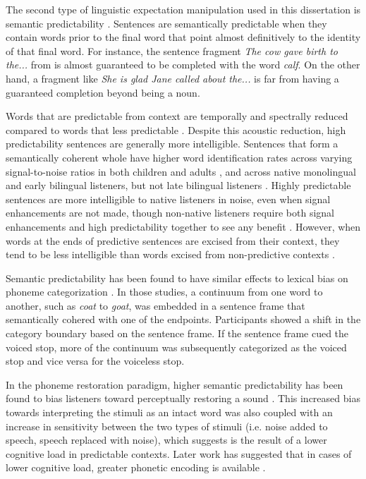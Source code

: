 The second type of linguistic expectation manipulation used in this dissertation is semantic predictability \citep{Kalikow1977}.
Sentences are semantically predictable when they contain words prior to the final word that point almost definitively to the identity of that final word.  
For instance, the sentence fragment \emph{The cow gave birth to the...} from \citet{Kalikow1977} is almost guaranteed to be completed with the word \emph{calf}.  
On the other hand, a fragment like \emph{She is glad Jane called about the...} is far from having a guaranteed completion beyond being a noun.

Words that are predictable from context are temporally and spectrally reduced compared to words that less predictable \cite{Scarborough2010, Clopper2008}. Despite this acoustic reduction, high predictability sentences are generally more intelligible.
Sentences that form a semantically coherent whole have higher word identification rates across varying signal-to-noise ratios \citep{Kalikow1977} in both children and adults \citep{Fallon2002}, and across native monolingual and early bilingual listeners, but not late bilingual listeners \citep{Mayo1997}.
Highly predictable sentences are more intelligible to native listeners in noise, even when signal enhancements are not made, though non-native listeners require both signal enhancements and high predictability together to see any benefit \cite{Bradlow2007}.
However, when words at the ends of predictive sentences are excised from their context, they tend to be less intelligible than words excised from non-predictive contexts \citep{Lieberman1963}.

Semantic predictability has been found to have similar effects to lexical bias on phoneme categorization \citep{Connine1987, Borsky1998}.  
In those studies, a continuum from one word to another, such as \emph{coat} to \emph{goat}, was embedded in a sentence frame that semantically cohered with one of the endpoints.  
Participants showed a shift in the category boundary based on the sentence frame.
If the sentence frame cued the voiced stop, more of the continuum was subsequently categorized as the voiced stop and vice versa for the voiceless stop.

In the phoneme restoration paradigm, higher semantic predictability has been found to bias listeners toward perceptually restoring a sound \citep{Samuel1981}.
This increased bias towards interpreting the stimuli as an intact word was also coupled with an increase in sensitivity between the two types of stimuli (i.e. noise added to speech, speech replaced with noise), which \citet{Samuel1981} suggests is the result of a lower cognitive load in predictable contexts. Later work has suggested that in cases of lower cognitive load, greater phonetic encoding is available \citep[see also][]{Mattys2011}.

